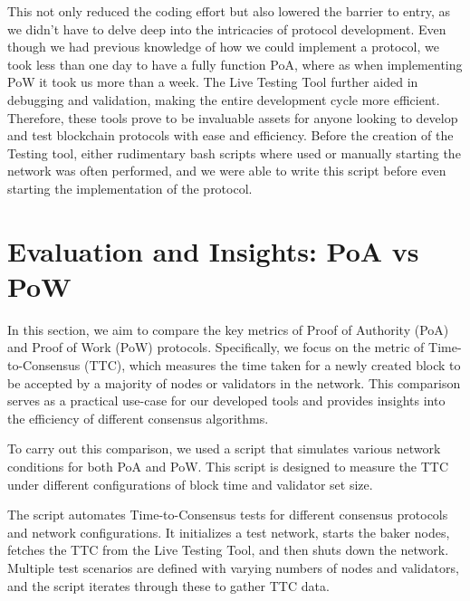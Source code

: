 This not only reduced the coding effort but also lowered the barrier to entry, as we didn't have to delve deep into the intricacies of protocol development. 
Even though we had previous knowledge of how we could implement a protocol, we took less than one day to have a fully function PoA, where as when implementing PoW it took us more than a week.
The Live Testing Tool further aided in debugging and validation, making the entire development cycle more efficient.
Therefore, these tools prove to be invaluable assets for anyone looking to develop and test blockchain protocols with ease and efficiency.
Before the creation of the Testing tool, either rudimentary bash scripts where used or manually starting the network was often performed, and we were able to write this script before even starting the implementation of the protocol.




\section{Evaluation and Insights: PoA vs PoW}

In this section, we aim to compare the key metrics of Proof of Authority (PoA) and Proof of Work (PoW) protocols. Specifically, we focus on the metric of Time-to-Consensus (TTC), which measures the time taken for a newly created block to be accepted by a majority of nodes or validators in the network. This comparison serves as a practical use-case for our developed tools and provides insights into the efficiency of different consensus algorithms.

To carry out this comparison, we used a script that simulates various network conditions for both PoA and PoW. This script is designed to measure the TTC under different configurations of block time and validator set size.

The script automates Time-to-Consensus tests for different consensus protocols and network configurations. It initializes a test network, starts the baker nodes, fetches the TTC from the Live Testing Tool, and then shuts down the network. Multiple test scenarios are defined with varying numbers of nodes and validators, and the script iterates through these to gather TTC data.


